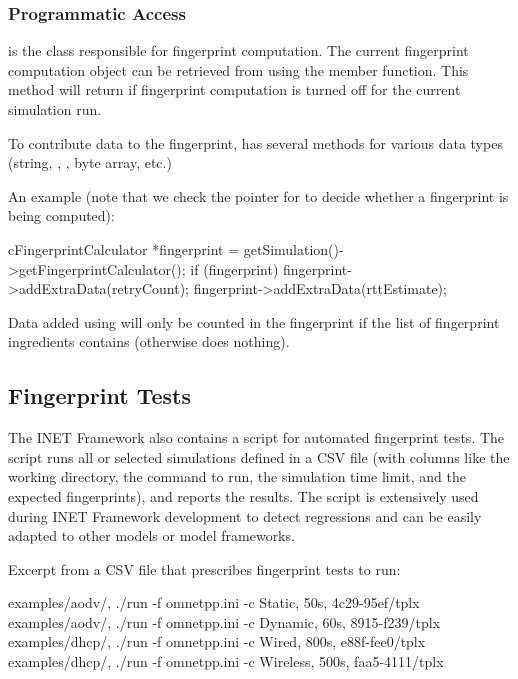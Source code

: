 \subsubsection{Programmatic Access}
\label{sec:testing:fingerprint-programmatic-access}

 is the class responsible for fingerprint computation.
The current fingerprint computation object can be retrieved from
 using the  member function.
This method will return  if fingerprint computation is turned
off for the current simulation run.

To contribute data to the fingerprint,  has several
 methods for various data types (string, ,
, byte array, etc.)

An example (note that we check the pointer for  to decide
whether a fingerprint is being computed):

\begin{cpp}
cFingerprintCalculator *fingerprint = getSimulation()->getFingerprintCalculator();
if (fingerprint) {
    fingerprint->addExtraData(retryCount);
    fingerprint->addExtraData(rttEstimate);
}
\end{cpp}

Data added using  will only be counted in the
fingerprint if the list of fingerprint ingredients contains 
(otherwise  does nothing).

\subsection{Fingerprint Tests}
\label{sec:testing:creating-fingerprint-tests}

The INET Framework also contains a script for automated fingerprint tests.
The script runs all or selected simulations defined in a CSV file
(with columns like the working directory, the command to run, the
simulation time limit, and the expected fingerprints), and reports the
results. The script is extensively used during INET Framework development
to detect regressions and can be easily adapted to other models or model
frameworks.

Excerpt from a CSV file that prescribes fingerprint tests to run:

\begin{filelisting}
examples/aodv/, ./run -f omnetpp.ini -c Static,   50s,  4c29-95ef/tplx
examples/aodv/, ./run -f omnetpp.ini -c Dynamic,  60s,  8915-f239/tplx
examples/dhcp/, ./run -f omnetpp.ini -c Wired,    800s, e88f-fee0/tplx
examples/dhcp/, ./run -f omnetpp.ini -c Wireless, 500s, faa5-4111/tplx
\end{filelisting}


